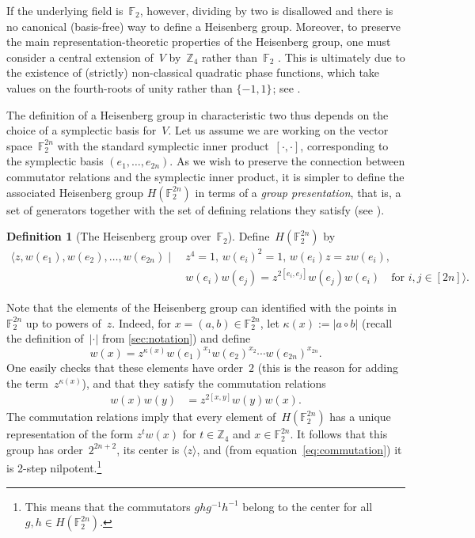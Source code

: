 \documentclass[11pt]{amsart}
\newcommand{\Z}{\mathbb{Z}} %
\newcommand{\F}{\mathbb{F}} %
\newcommand{\pmset}[1]{\{-1,1\}^{#1}} %
\theoremstyle{plain}
\theoremstyle{definition}
\newtheorem{definition}[theorem]{Definition}
\theoremstyle{remark}
\begin{document}
If the underlying field is~$\F_2$, however, dividing by two is disallowed and there is no canonical (basis-free) way to define a Heisenberg group.
Moreover, to preserve the main representation-theoretic properties of the Heisenberg group, one must consider a central extension of~$V$ by~$\Z_4$ rather than~$\F_2$ \cite{GurevichH2012}.
This is ultimately due to the existence of (strictly) non-classical quadratic phase functions, which take values on the fourth-roots of unity rather than $\pmset{}$;
see \cite[Section~0.2]{GurevichH2012}.

The definition of a Heisenberg group in characteristic two thus depends on the choice of a symplectic basis for~$V$.
Let us assume we are working on the vector space~$\F_2^{2n}$ with the standard symplectic inner product~$[\cdot,\cdot]$, corresponding to the symplectic basis $(e_1, \dots, e_{2n})$.
As we wish to preserve the connection between commutator relations and the symplectic inner product, it is simpler to define the associated Heisenberg group $H(\F_2^{2n})$ in terms of a \emph{group presentation}, that is, a set of generators together with the set of defining relations they satisfy (see \cite[Chapter~7.10]{artin_algebra}).

\begin{definition}[The Heisenberg group over~$\F_2$]
    Define~$H(\F_2^{2n})$ by
    \begin{align}\label{eq:Heisrelations}
        \big\langle z, w(e_1), w(e_2), \dots, w(e_{2n}) \mid\: &z^4=1,\, w(e_i)^2 = 1,\, w(e_i)z = zw(e_i),\\
        &w(e_i)w(e_j) = z^{2[e_i,e_j]}w(e_j)w(e_i) \quad \text{for $i,j\in [2n]$}\big\rangle.\nonumber
    \end{align}
\end{definition}

Note that the elements of the Heisenberg group can identified with the points in~$\F_2^{2n}$ up to powers of~$z$.
Indeed, for $x = (a,b)\in \F_2^{2n}$, let $\kappa(x) := |a\circ b|$ (recall the definition of~$|\cdot|$ from \cref{sec:notation}) and define
\begin{equation}\label{eq:wxdef}
    w(x) = z^{\kappa(x)}w(e_1)^{x_1}w(e_2)^{x_2}\cdots w(e_{2n})^{x_{2n}}.
\end{equation}
One easily checks that these elements have order~$2$ (this is the reason for adding the term~$z^{\kappa(x)}$), and that they satisfy the commutation relations
\begin{align}\label{eq:commutation}
    w(x)w(y) &= z^{2[x,y]}w(y)w(x).
\end{align}
The commutation relations imply that every element of~$H(\F_2^{2n})$ has a unique representation of the form $z^tw(x)$ for $t\in \Z_4$ and $x\in \F_2^{2n}$.
It follows that this group has order~$2^{2n+2}$, its center is $\langle z\rangle$, and (from equation~\eqref{eq:commutation}) it is 2-step nilpotent.\footnote{This means that the commutators $ghg^{-1}h^{-1}$ belong to the center for all $g, h \in H(\F_2^{2n})$.}
\end{document}
